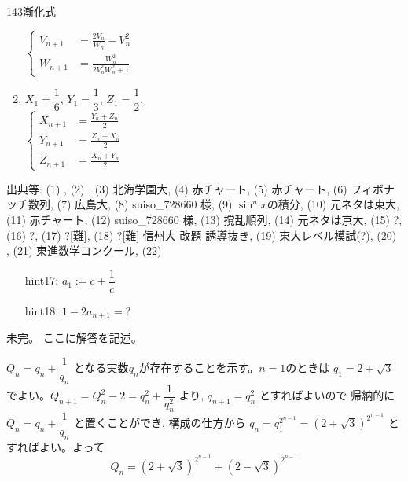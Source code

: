 \begin{thm}{143}{}{漸化式}
\begin{enumerate}
	$\left\{
	\begin{aligned}
	 V_{n+1}&=\frac{2V_n}{W_n}-V_n^2 \\
	 W_{n+1}&=\frac{W_n^2}{2V_n^2W_n^2+1}
	\end{aligned}
	\right.$
  \item $X_1=\dfrac{1}{6}$, $Y_1=\dfrac{1}{3}$, $Z_1=\dfrac{1}{2}$, \\
	$\left\{
	\begin{aligned}
	 X_{n+1}&=\frac{Y_n+Z_n}{2} \\
	 Y_{n+1}&=\frac{Z_n+X_n}{2} \\
	 Z_{n+1}&=\frac{X_n+Y_n}{2}
	\end{aligned}
	\right.$
 \end{enumerate}
 出典等: (1) , (2) , (3)  北海学園大, (4)  赤チャート, (5)  赤チャート, (6)  フィボナッチ数列, (7)  広島大, (8)  suiso\_728660 様, (9)  $\sin^n x$の積分, (10)  元ネタは東大, (11)  赤チャート, (12)  suiso\_728660 様, (13)  撹乱順列, (14)  元ネタは京大, (15) \hosi ?, (16) \hosi ?, (17) \hosi ?[難], (18) \hosi ?[難] 信州大 改題 誘導抜き, (19)  東大レベル模試(?), (20) , (21)  東進数学コンクール, (22) 
 \begin{itemize}
  \setlength{\itemindent}{20pt}
  \item[hint17:] $a_1 := c+\dfrac{1}{c}$
  \item[hint18:] $1-2a_{n+1}=?$ 
 \end{itemize}
\end{thm}

未完。
ここに解答を記述。

$Q_n=q_n+\dfrac{1}{q_n}$ となる実数$q_n$が存在することを示す。$n=1$のときは $q_1=2+\sqrt{3}$でよい。$Q_{n+1}=Q_n^2-2= q_n^2+\dfrac{1}{q_n^2}$ より, $q_{n+1}=q_n^2$ とすればよいので 帰納的に $Q_n=q_n+\dfrac{1}{q_n}$ と置くことができ, 構成の仕方から $q_n=q_1^{2^{n-1}}=(2+\sqrt{3})^{2^{n-1}}$ とすればよい。よって
\[Q_n= (2+\sqrt{3})^{2^{n-1}}+ (2-\sqrt{3})^{2^{n-1}}\]

